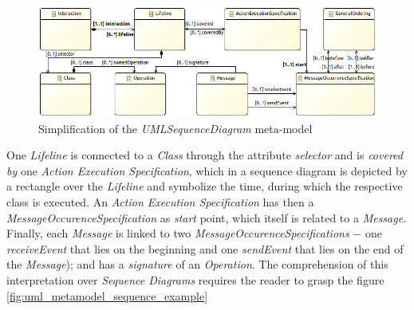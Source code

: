 \documentclass[tuberlin,cic,tc,english,noabntcite]{iiufrgs}
\begin{document}
\begin{figure}[h]
    \caption{Simplification of the \emph{UMLSequenceDiagram} meta-model}
    \begin{center}
        \includegraphics[width=\textwidth]{umlSequenceDiagramSimple01}
    \end{center}
    \label{fig:uml_metamodel_sequence}
\end{figure}

One \emph{Lifeline} is connected to a \emph{Class} through the attribute \emph{selector} and is \emph{covered by} one \emph{Action Execution Specification}, which in a sequence diagram is depicted by a rectangle over the \emph{Lifeline} and symbolize the time, during which the respective class is executed. An \emph{Action Execution Specification} has then a \emph{MessageOccurenceSpecification} as \emph{start} point, which itself is related to a \emph{Message}. Finally, each \emph{Message} is linked to two \emph{MessageOccurenceSpecifications} $-$ one \emph{receiveEvent} that lies on the beginning and one \emph{sendEvent} that lies on the end of the \emph{Message}); and has a \emph{signature} of an \emph{Operation}. The comprehension of this interpretation over \emph{Sequence Diagrams} requires the reader to grasp the figure \ref{fig:uml_metamodel_sequence_example}
\end{document}
